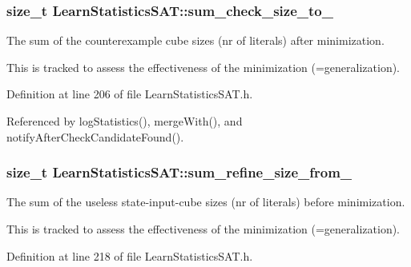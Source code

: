 \hypertarget{classLearnStatisticsSAT_ae805d5a2fc2f724d325136a9f30e6b4b}{
\subsubsection[{sum\-\_\-check\-\_\-size\-\_\-to\-\_\-}]{\setlength{\rightskip}{0pt plus 5cm}size\-\_\-t Learn\-Statistics\-S\-A\-T\-::sum\-\_\-check\-\_\-size\-\_\-to\-\_\-\hspace{0.3cm}{\ttfamily [protected]}}}\label{classLearnStatisticsSAT_ae805d5a2fc2f724d325136a9f30e6b4b}


The sum of the counterexample cube sizes (nr of literals) after minimization. 

This is tracked to assess the effectiveness of the minimization (=generalization). 

Definition at line 206 of file Learn\-Statistics\-S\-A\-T.\-h.



Referenced by log\-Statistics(), merge\-With(), and notify\-After\-Check\-Candidate\-Found().

\hypertarget{classLearnStatisticsSAT_a7f36ead437ee4833c96342d812551cce}{
\subsubsection[{sum\-\_\-refine\-\_\-size\-\_\-from\-\_\-}]{\setlength{\rightskip}{0pt plus 5cm}size\-\_\-t Learn\-Statistics\-S\-A\-T\-::sum\-\_\-refine\-\_\-size\-\_\-from\-\_\-\hspace{0.3cm}{\ttfamily [protected]}}}\label{classLearnStatisticsSAT_a7f36ead437ee4833c96342d812551cce}


The sum of the useless state-\/input-\/cube sizes (nr of literals) before minimization. 

This is tracked to assess the effectiveness of the minimization (=generalization). 

Definition at line 218 of file Learn\-Statistics\-S\-A\-T.\-h.



